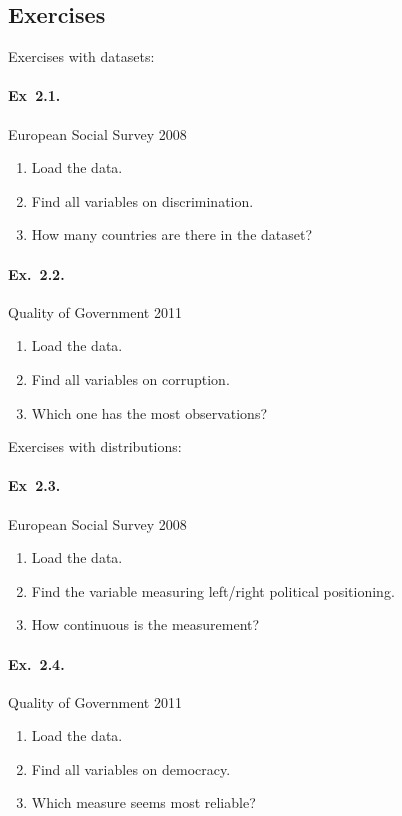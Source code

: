 \subsection*{Exercises}%

Exercises with datasets:

\begin{mybox}
\paragraph{Ex~2.1.} European Social Survey 2008 %
  \begin{enumerate}
    \item Load the data.
    \item Find all variables on discrimination.
    \item How many countries are there in the dataset?
  \end{enumerate}
\end{mybox}

\begin{mybox}
\paragraph{Ex.~2.2.} Quality of Government 2011 %
  \begin{enumerate}
    \item Load the data.
    \item Find all variables on corruption.
    \item Which one has the most observations?
  \end{enumerate}
\end{mybox}

\noindent%
Exercises with distributions:

\begin{mybox}
\paragraph{Ex~2.3.} European Social Survey 2008 %
    \begin{enumerate}
      \item Load the data.
      \item Find the variable measuring left/right political positioning.
      \item How continuous is the measurement?
    \end{enumerate}
\end{mybox}

\begin{mybox}
\paragraph{Ex.~2.4.} Quality of Government 2011 %
  \begin{enumerate}
    \item Load the data.
    \item Find all variables on democracy.
    \item Which measure seems most reliable?
  \end{enumerate}
\end{mybox}
